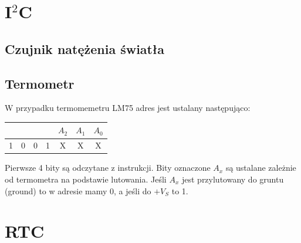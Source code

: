 \documentclass[11pt]{article}
\begin{document}
\section{I$^2$C}
\subsection{Czujnik natężenia światła}
\subsection{Termometr}
W przypadku termomemetru LM75 adres jest ustalany następująco:
\begin{center}
    \begin{tabular}{|c|c|c|c|c|c|c|}
        \hline
         & & & & $A_2$ & $A_1$ & $A_0$\\
        \hline
        1& 0& 0& 1& X & X & X\\
        \hline
    \end{tabular}
\end{center}
Pierwsze 4 bity są odczytane z instrukcji. Bity oznaczone $A_x$ są ustalane
zależnie od termometra na podstawie lutowania. Jeśli $A_x$ jest przylutowany
do gruntu (ground) to w adresie mamy 0, a jeśli do $+V_S$ to 1.
\section{RTC}
\end{document}
